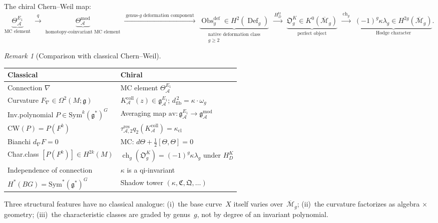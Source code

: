 \documentclass[11pt,reqno]{amsart}
\theoremstyle{definition}
\theoremstyle{remark}
\newtheorem{remark}[theorem]{Remark}
\newcommand{\cA}{\mathcal{A}}
\newcommand{\Mbar}{\overline{\mathcal{M}}}
\newcommand{\fg}{\mathfrak{g}}
\newcommand{\gmod}{\mathfrak{g}^{\mathrm{mod}}_\cA}
\newcommand{\gEone}{\mathfrak{g}^{E_1}_\cA}
\newcommand{\Eone}{E_1}
\newcommand{\Sym}{\mathrm{Sym}}
\newcommand{\av}{\mathrm{av}}
\newcommand{\dfib}{d_{\mathrm{fib}}}
\newcommand{\CW}{\mathrm{CW}}
\numberwithin{equation}{section}
\begin{document}
The chiral Chern--Weil map:
\begin{equation}\label{eq:chiral-cw-map}
\underbrace{\Theta^{\Eone}_\cA}_{\text{MC element}}
\;\xrightarrow{\;q\;}
\;\underbrace{\Theta^{\mathrm{mod}}_\cA}_{\text{homotopy-coinvariant MC element}}
\;\xrightarrow{\;\text{genus-$g$ deformation component}\;}
\;\underbrace{\operatorname{Obs}^{\mathrm{def}}_g\in
H^2(\operatorname{Def}_g)}_{\substack{\text{native deformation class}\\
g\geq2}}
\;\xrightarrow{\;H_D^{\mathrm{tr}}\;}
\;\underbrace{\mathfrak O_g^K\in K^0(\Mbar_g)}_{\text{perfect object}}
\;\xrightarrow{\;\operatorname{ch}_g\;}
\;\underbrace{(-1)^g\kappa\lambda_g\in H^{2g}(\Mbar_g)}_{\text{Hodge character}}.
\end{equation}

\begin{remark}[Comparison with classical Chern--Weil]
\label{rem:comparison}
\begin{center}
\renewcommand{\arraystretch}{1.3}
\begin{tabular}{@{}p{4.2cm}p{5.5cm}@{}}
\toprule
\textbf{Classical} & \textbf{Chiral} \\
\midrule
Connection $\nabla$ & MC element $\Theta^{\Eone}_\cA$ \\
Curvature $F_\nabla \in \Omega^2(M;\fg)$
 & $K_\cA^{\mathrm{coll}}(z) \in \gEone$; $\dfib^{\,2} = \kappa\cdot\omega_g$ \\
Inv.\@ polynomial $P \in \Sym^k(\fg^*)^G$
 & Averaging map $\av\colon\gEone\to\gmod$ \\
$\CW(P) = P(F^k)$
 & $\tau_{\cA,2}^{\mathrm{res}}q_2(K_\cA^{\mathrm{coll}})=\kappa_{\mathrm{cl}}$ \\
Bianchi $d_\nabla F = 0$
 & MC: $d\Theta + \frac{1}{2}[\Theta,\Theta] = 0$ \\
Char.\@ class $[P(F^k)] \in H^{2k}(M)$
 & $\operatorname{ch}_g(\mathfrak O_g^K)=(-1)^g\kappa\lambda_g$ under $H_D^K$ \\
Independence of connection
 & $\kappa$ is a qi-invariant \\
$H^*(BG) = \Sym^*(\fg^*)^G$
 & Shadow tower $(\kappa,\mathfrak{C},\mathfrak{Q},\ldots)$ \\
\bottomrule
\end{tabular}
\end{center}
Three structural features have no classical analogue:
(i)~the base curve~$X$ itself varies over~$\Mbar_g$;
(ii)~the curvature factorizes as algebra $\times$ geometry;
(iii)~the characteristic classes are graded by
genus~$g$, not by degree of an invariant polynomial.
\end{remark}
\end{document}
